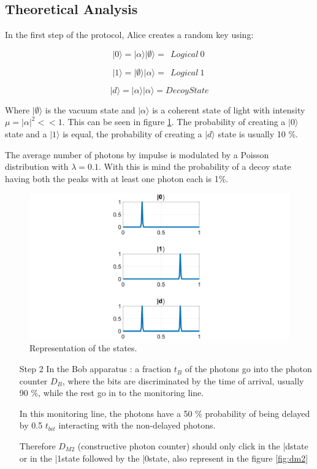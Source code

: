 \begin{refsection}
\subsection{Theoretical Analysis}

In the first step of the protocol, Alice creates a random key using:

$$|0\rangle = |\alpha\rangle |\emptyset\rangle =\ \ Logical\ 0\ $$

$$|1\rangle = |\emptyset\rangle |\alpha\rangle =\ \ Logical\ 1\ $$

$$|d\rangle = |\alpha\rangle |\alpha\rangle = Decoy State$$

Where $|\emptyset\rangle$ is the vacuum state and $|\alpha\rangle$ is a coherent state of light with intensity $\mu=|\alpha|^2<<1$. This can be seen in figure \ref{fig:sta}.
The probability of creating a $|0\rangle$ state and a $|1\rangle$ is equal, the probability of creating a $|d\rangle$ state is usually 10 \%.

The average number of photons by impulse is modulated by a Poisson distribution with $\lambda=0.1$. With this is mind the probability of a decoy state having both the peaks with at least one photon each is 1\%.

\begin{figure}[h]
\centering
\includegraphics[width=0.4\linewidth]{./sdf/tq_76558_cow_protocol/slides/figures/S1A.pdf}
\caption{Representation of the states.}
\label{fig:sta}
\end{figure}

\begin{itemize}
\item [Step 2]  In the Bob apparatus : a fraction $t_B$ of the photons go into the photon counter $D_B$, where the bits are discriminated by the time of arrival, usually 90 \%, while the rest go in to the monitoring line.

In this monitoring line, the photons have a 50 \% probability of being delayed by 0.5 $t_{bit}$ interacting with the non-delayed photons.

Therefore $D_{M2}$ (constructive photon counter) should only click in the |d\rangle state or in the |1\rangle state followed by the |0\rangle state, also represent in the figure \ref{fig:dm2}


\end{itemize}
\end{refsection}
